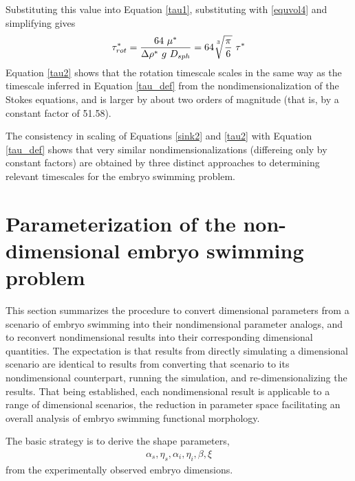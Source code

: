 \documentclass[10pt,a4paper]{article}
\begin{document}
Substituting this value into Equation \ref{tau1}, substituting with \ref{equvol4} and simplifying gives
\begin{equation}\label{tau2}
	\tau^*_{rot} = \frac{64 ~ \mu^*}{\Delta \rho^* ~ g ~ D_{sph}} 
	=  64\sqrt[\uproot{5}3]{\frac{\pi}{6}} ~ \tau^*
\end{equation}
Equation \ref{tau2} shows that the rotation timescale scales in the same way as the timescale inferred in Equation \ref{tau_def} from the nondimensionalization of the Stokes equations, and is larger by about two orders of magnitude (that is, by a constant factor of 51.58).

The consistency in scaling of Equations \ref{sink2} and \ref{tau2} with Equation \ref{tau_def} shows that very similar nondimensionalizations (differeing only by constant factors) are obtained by three distinct approaches to determining relevant timescales for the embryo swimming problem.


\section{Parameterization of the non-dimensional embryo swimming problem}\label{NDparsSect}
This section summarizes the procedure to convert dimensional parameters from a scenario of embryo swimming into their nondimensional parameter analogs, and to reconvert nondimensional results into their corresponding dimensional quantities.
The expectation is that results from directly simulating a dimensional scenario are identical to results from converting that scenario to its nondimensional counterpart, running the simulation, and re-dimensionalizing the results.
That being established, each nondimensional result is applicable to a range of dimensional scenarios, the reduction in parameter space facilitating an overall analysis of embryo swimming functional morphology.

The basic strategy is to derive the shape parameters, 
\begin{eqnarray}\label{shapars}
	\alpha_s, \eta_s, \alpha_{i}, \eta_{i}, \beta, \xi
\end{eqnarray}
from the experimentally observed embryo dimensions.
\end{document}
